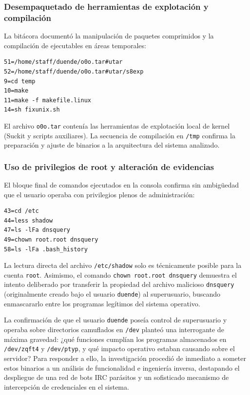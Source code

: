 \subsubsection{Desempaquetado de herramientas de explotación y compilación}

La bitácora documentó la manipulación de paquetes comprimidos y la compilación de ejecutables en áreas temporales:
\begin{lstlisting}[style=terminal]
51=/home/staff/duende/o0o.tar#utar
52=/home/staff/duende/o0o.tar#utar/s8exp
9=cd temp
10=make
11=make -f makefile.linux
14=sh fixunix.sh
\end{lstlisting}
El archivo \texttt{o0o.tar} contenía las herramientas de explotación local de kernel (Suckit y scripts auxiliares). La secuencia de compilación en \texttt{/tmp} confirma la preparación y ajuste de binarios a la arquitectura del sistema analizado.

\subsubsection{Uso de privilegios de root y alteración de evidencias}

El bloque final de comandos ejecutados en la consola confirma sin ambigüedad que el usuario operaba con privilegios plenos de administración:
\begin{lstlisting}[style=terminal]
43=cd /etc
44=less shadow
47=ls -lFa dnsquery
49=chown root.root dnsquery
58=ls -lFa .bash_history
\end{lstlisting}
La lectura directa del archivo \texttt{/etc/shadow} solo es técnicamente posible para la cuenta \texttt{root}. Asimismo, el comando \texttt{chown root.root dnsquery} demuestra el intento deliberado por transferir la propiedad del archivo malicioso \texttt{dnsquery} (originalmente creado bajo el usuario \texttt{duende}) al superusuario, buscando enmascararlo entre los programas legítimos del sistema operativo.

La confirmación de que el usuario \texttt{duende} poseía control de superusuario y operaba sobre directorios camuflados en \texttt{/dev} planteó una interrogante de máxima gravedad: ¿qué funciones cumplían los programas almacenados en \texttt{/dev/zqft4} y \texttt{/dev/ptyp}, y qué impacto operativo estaban causando sobre el servidor? Para responder a ello, la investigación procedió de inmediato a someter estos binarios a un análisis de funcionalidad e ingeniería inversa, destapando el despliegue de una red de bots IRC parásitos y un sofisticado mecanismo de intercepción de credenciales en el sistema.
